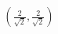 \documentclass[preview]{standalone}
\begin{document}
\begin{align*}
( \frac{2}{\sqrt{2}} , \frac{2}{\sqrt{2}} )
\end{align*}
\end{document}
